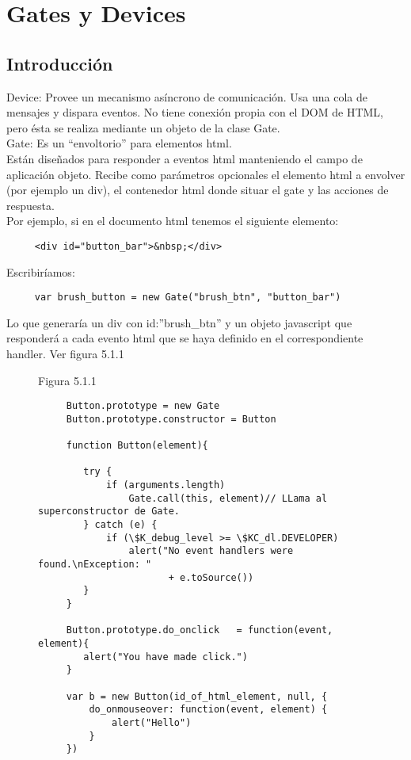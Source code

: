 \section{Gates y Devices}
\label{sec:gates_devices}

\subsection{Introducción}
\label{subsection:intro_gates}

Device: Provee un mecanismo asíncrono de comunicación. Usa una cola de mensajes y dispara eventos. No tiene conexión propia con el DOM de HTML,
pero ésta se realiza mediante un objeto de la clase Gate.\\

Gate: Es un “envoltorio” para elementos html.\\

Están diseñados para responder a eventos html manteniendo el campo de aplicación objeto. Recibe como parámetros opcionales el elemento html a 
envolver (por ejemplo un div), el contenedor html donde situar el gate y las acciones de respuesta.\\

Por ejemplo, si en el documento html tenemos el siguiente elemento:
\begin{verbatim}
     <div id="button_bar">&nbsp;</div>
\end{verbatim}
Escribiríamos:
\begin{verbatim}
     var brush_button = new Gate("brush_btn", "button_bar")
\end{verbatim}
Lo que generaría un div con id:”brush\_btn” y un objeto javascript que responderá a cada evento html que se haya definido en el correspondiente 
handler. Ver figura 5.1.1

\begin{figure}[p]
Figura 5.1.1
\begin{verbatim}
     Button.prototype = new Gate
     Button.prototype.constructor = Button

     function Button(element){

        try {
            if (arguments.length)
                Gate.call(this, element)// LLama al superconstructor de Gate.
        } catch (e) {
            if (\$K_debug_level >= \$KC_dl.DEVELOPER)
                alert("No event handlers were found.\nException: " 
                       + e.toSource())
        }
     }

     Button.prototype.do_onclick   = function(event, element){
        alert("You have made click.")
     }

     var b = new Button(id_of_html_element, null, {
         do_onmouseover: function(event, element) {
             alert("Hello")
         }
     })
\end{verbatim}
\end{figure}

